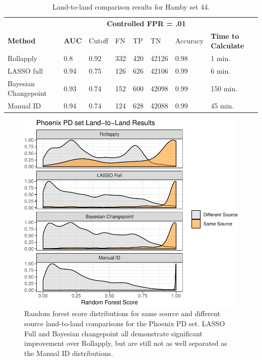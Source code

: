 \documentclass[12pt]{article}
\begin{document}
\begin{table}[]
\centering
\begin{tabular}{llllllll}
& & \multicolumn{5}{c}{\textbf{Controlled FPR = .01}} & \\
\textbf{Method} & \textbf{AUC} & Cutoff & FN &TP & TN & Accuracy & \textbf{Time to Calculate} \\ \hline
Rollapply & 0.8 &  0.92 & 332 & 420&42126 & 0.98 & 1 min.\\ \hline
LASSO full & 0.94 &  0.75 &126 &626 &42106 & 0.99 & 6 min. \\ \hline
Bayesian Changepoint & 0.93 &  0.74 &152 & 600&42098 & 0.99 & 150 min. \\ \hline
Manual ID & 0.94 & 0.74 & 124& 628&42088 & 0.99 & 45 min. \\ \hline 
\end{tabular}
\caption{Land-to-land comparison results for Hamby set 44.}
\label{hamby-table}
\end{table}

\begin{figure}
\centering
\includegraphics{writeup_files/figure-latex/phoenix-groove-results-1.pdf}
\caption{\label{phoenix-groove-results}Random forest score distributions
for same source and different source land-to-land comparisons for the
Phoenix PD set. LASSO Full and Bayesian changepoint all demonstrate
significant improvement over Rollapply, but are still not as well
separated as the Manual ID distributions.}
\end{figure}
\end{document}
